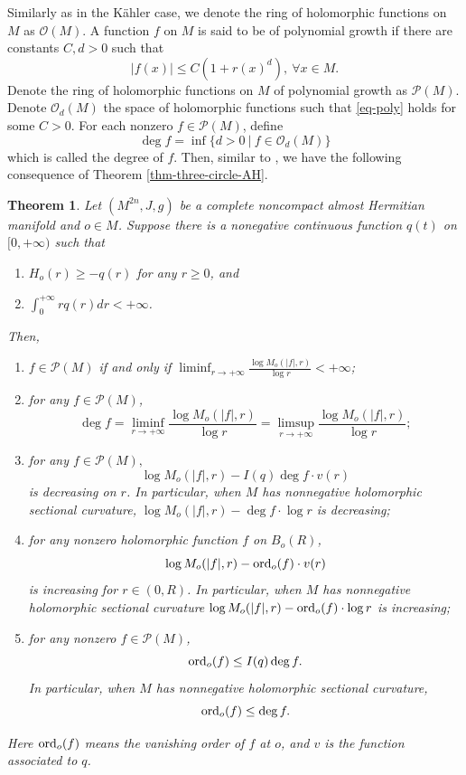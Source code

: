 \documentclass[12pt]{amsart}
\newtheorem{thm}{Theorem}[section]
\theoremstyle{definition}
\theoremstyle{remark}
\numberwithin{equation}{section}
\def\ord{{\rm ord}}
\def\D{\displaystyle}
\begin{document}
Similarly as in the K\"ahler case, we denote the ring of holomorphic functions on $M$ as  $\mathcal O(M)$. A function $f$ on $M$ is said to be of polynomial growth if there are constants $C,d>0$ such that
\begin{equation}\label{eq-poly}
|f(x)|\leq C(1+r(x)^d),\ \forall x\in M.
\end{equation}
Denote the ring of holomorphic functions on $M$ of polynomial growth as $\mathcal P(M)$. Denote $\mathcal O_d(M)$ the space of holomorphic functions such that \eqref{eq-poly} holds for some $C>0$. For each nonzero $f\in \mathcal P(M)$, define
\begin{equation}
\deg f=\inf\{d>0\ |\ f\in \mathcal O_d(M)\}
\end{equation}
which is called the degree of $f$. Then, similar to \cite{Liu}, we have the following consequence of Theorem \ref{thm-three-circle-AH}.
\begin{thm}\label{thm-mono-2}
Let $(M^{2n},J,g)$ be a complete noncompact almost Hermitian manifold and $o\in M$. Suppose there is a nonegative continuous function $q(t)$ on $[0,+\infty)$ such that  \begin{enumerate}
\item $H_o(r)\geq -q(r)$ for any $r\geq0$, and
\item $\D\int_0^{+\infty}rq(r)dr<+\infty$.
\end{enumerate}
Then,
\begin{enumerate}
\item $\displaystyle f\in \mathcal P(M)$ if and only if $\displaystyle\liminf_{r\to+\infty}\frac{\log M_o(|f|,r)}{\log r}<+\infty$;
\item for any $f\in \mathcal P(M)$, $$\deg f=\liminf_{r\to+\infty}\frac{\log M_o(|f|,r)}{\log r}=\limsup_{r\to+\infty}\frac{\log M_o(|f|,r)}{\log r};$$
\item for any $f\in \mathcal P(M),$ $$\log M_o(|f|,r)-I(q)\deg f\cdot v(r)$$ is decreasing on $r$. In particular, when $M$ has nonnegative holomorphic sectional curvature, $\log M_o(|f|,r)-\deg f\cdot \log r$ is decreasing;
\item for any nonzero holomorphic function $f$ on $B_o(R)$, $$\log M_o(|f|,r)-\ord_o(f)\cdot v(r)$$ is increasing for $r\in (0,R)$. In particular, when $M$ has nonnegative holomorphic sectional curvature $\log M_o(|f|,r)-\ord_o(f)\cdot \log r$ is increasing;
\item for any nonzero $f\in \mathcal P(M)$, $$\ord_o(f)\leq I(q)\deg f.$$ In particular, when $M$ has nonnegative holomorphic sectional curvature, $$\ord_o(f)\leq \deg f.$$
\end{enumerate}
Here $\ord_o(f)$ means the vanishing order of $f$ at $o$, and $v$ is the function associated to $q$.
\end{thm}
\end{document}
